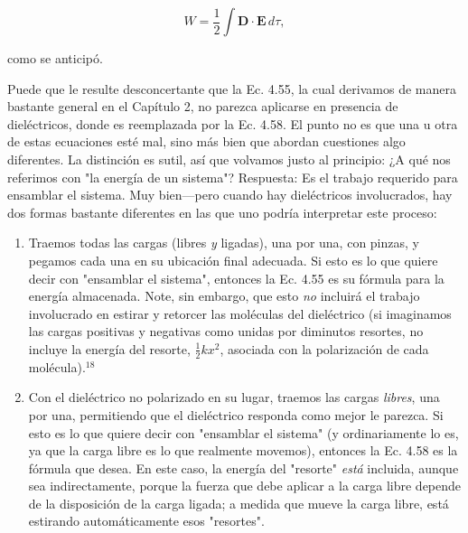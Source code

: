 \documentclass[12pt,a4paper]{report}
\newcommand{\esp}{\vspace{0.5cm}}
\begin{document}
	\esp
	
	\begin{equation}
		W = \frac{1}{2} \int \mathbf{D} \cdot \mathbf{E} \, d\tau,
	\end{equation}
	
	\esp
	
	\noindent como se anticipó.

	\esp
	
	Puede que le resulte desconcertante que la Ec. 4.55, la cual derivamos de manera bastante general en el Capítulo 2, no parezca aplicarse en presencia de dieléctricos, donde es reemplazada por la Ec. 4.58. El punto no es que una u otra de estas ecuaciones esté mal, sino más bien que abordan cuestiones algo diferentes. La distinción es sutil, así que volvamos justo al principio: ¿A qué nos referimos con "la energía de un sistema"? Respuesta: Es el trabajo requerido para ensamblar el sistema. Muy bien—pero cuando hay dieléctricos involucrados, hay dos formas bastante diferentes en las que uno podría interpretar este proceso:
	
	\esp
	
	\begin{enumerate}
		\item Traemos todas las cargas (libres \textit{y} ligadas), una por una, con pinzas, y pegamos cada una en su ubicación final adecuada. Si esto es lo que quiere decir con "ensamblar el sistema", entonces la Ec. 4.55 es su fórmula para la energía almacenada. Note, sin embargo, que esto \textit{no} incluirá el trabajo involucrado en estirar y retorcer las moléculas del dieléctrico (si imaginamos las cargas positivas y negativas como unidas por diminutos resortes, no incluye la energía del resorte, $\frac{1}{2}kx^2$, asociada con la polarización de cada molécula).$^{18}$
		
		\esp
		
		\item Con el dieléctrico no polarizado en su lugar, traemos las cargas \textit{libres}, una por una, permitiendo que el dieléctrico responda como mejor le parezca. Si esto es lo que quiere decir con "ensamblar el sistema" (y ordinariamente lo es, ya que la carga libre es lo que realmente movemos), entonces la Ec. 4.58 es la fórmula que desea. En este caso, la energía del "resorte" \textit{está} incluida, aunque sea indirectamente, porque la fuerza que debe aplicar a la carga libre depende de la disposición de la carga ligada; a medida que mueve la carga libre, está estirando automáticamente esos "resortes".
	\end{enumerate}
	
\end{document}
